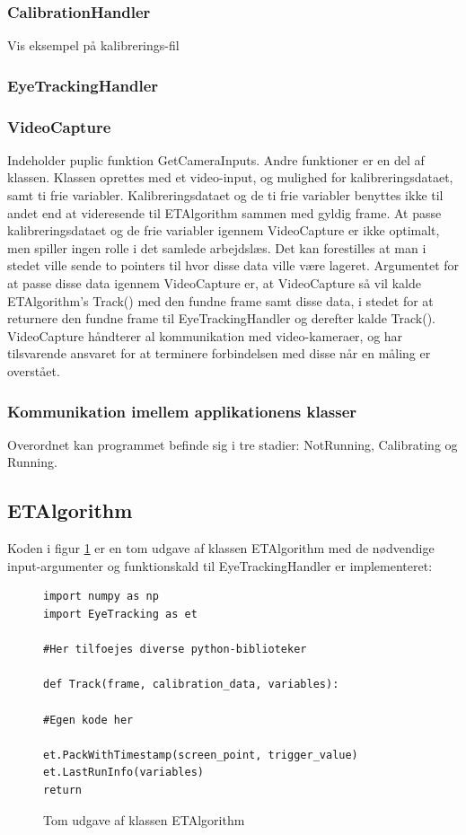 \documentclass[rapport.tex]{subfiles}
\begin{document}
	\subsubsection{CalibrationHandler}
	Vis eksempel på kalibrerings-fil
	
	\subsubsection{EyeTrackingHandler}
	
	
	\subsubsection{VideoCapture}
	Indeholder puplic funktion GetCameraInputs. 
	Andre funktioner er en del af klassen. Klassen oprettes med et video-input, og mulighed for kalibreringsdataet, samt ti frie variabler. Kalibreringsdataet og de ti frie variabler benyttes ikke til andet end at videresende til ETAlgorithm sammen med gyldig frame. 
	At passe kalibreringsdataet og de frie variabler igennem VideoCapture er ikke optimalt, men spiller ingen rolle i det samlede arbejdslæs. Det kan forestilles at man i stedet ville sende to pointers til hvor disse data ville være lageret. Argumentet for at passe disse data igennem VideoCapture er, at VideoCapture så vil kalde ETAlgorithm's Track() med den fundne frame samt disse data, i stedet for at returnere den fundne frame til EyeTrackingHandler og derefter kalde Track(). VideoCapture håndterer al kommunikation med video-kameraer, og har tilsvarende ansvaret for at terminere forbindelsen med disse når en måling er overstået. 
		
	\subsubsection{Kommunikation imellem applikationens klasser}	
	
	Overordnet kan programmet befinde sig i tre stadier: NotRunning, Calibrating og Running. 	
	
	\subsection{ETAlgorithm}
	Koden i figur \ref{list:emptyalg} er en tom udgave af klassen ETAlgorithm med de nødvendige input-argumenter og funktionskald til EyeTrackingHandler er implementeret:

\begin{figure}
	\caption{Tom udgave af klassen ETAlgorithm}
	\label{list:emptyalg}
\begin{lstlisting}
import numpy as np
import EyeTracking as et

#Her tilfoejes diverse python-biblioteker

def Track(frame, calibration_data, variables):

#Egen kode her 

et.PackWithTimestamp(screen_point, trigger_value)
et.LastRunInfo(variables)
return
\end{lstlisting}
\end{figure}
\end{document}
